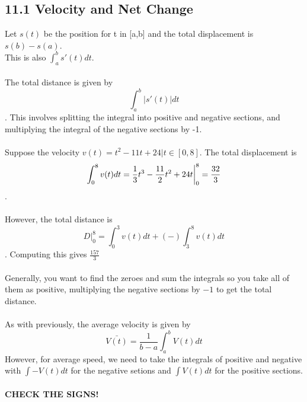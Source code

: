 \documentclass[twocolumn, 12pt]{report}
\begin{document}
 \subsection{11.1 Velocity and Net Change}
 Let $s(t)$ be the position for t in [a,b] and the total displacement is $s(b)-s(a)$. \\This is also $\int_a^b s'(t) dt$. \\\\ The total distance is given by $$\int_a^b |s'(t)| dt$$. This involves splitting the integral into positive and negative sections, and multiplying the integral of the negative sections by -1.\\\\ Suppose the velocity $v(t) = t^2 - 11t + 24 | t\in[0 ,8]$. The total displacement is $$\int_0^8 v(t)dt = \frac{1}{3}t^3 - \frac{11}{2} t^2 + 24t \bigg{|}_0^8 = \frac{32}{3}$$. \\\\
 However, the total distance is $$D|^8_0 = \int_0^3v(t)dt + (-)\int_3^8 v(t)dt$$. Computing this gives $\frac{157}{3}$\\\\ Generally, you want to find the zeroes and sum the integrals so you take all of them as positive, multiplying the negative sections by $-1$ to get the total distance. \\\\
 As with previously, the average velocity is given by $$\bar{V(t)}=\frac{1}{b-a} \int_a^b V(t)dt$$ However, for average speed, we need to take the integrals of positive and negative with $\int -V(t)dt$ for the negative setions and $\int V(t)dt$ for the positive sections. \\\\ \textbf{CHECK THE SIGNS!}
\end{document}
